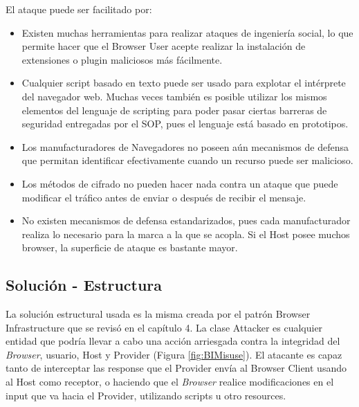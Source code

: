 \documentclass{sig-alternate-05-2015}
\begin{document}
El ataque puede ser facilitado por:
\begin{itemize}
  \item Existen muchas herramientas para realizar ataques de ingeniería social, lo que permite hacer que el Browser User acepte realizar la instalación de extensiones o plugin maliciosos más fácilmente.
  \item Cualquier script basado en texto puede ser usado para explotar el intérprete del navegador web. Muchas veces también es posible utilizar los mismos elementos del lenguaje de scripting para poder pasar ciertas barreras de seguridad entregadas por el SOP, pues el lenguaje está basado en prototipos. 
  \item Los manufacturadores de Navegadores no poseen aún mecanismos de defensa que permitan identificar efectivamente cuando un recurso puede ser malicioso.
  \item Los métodos de cifrado no pueden hacer nada contra un ataque que puede modificar el tráfico antes de enviar o después de recibir el mensaje.
  \item No existen mecanismos de defensa estandarizados, pues cada manufacturador realiza lo necesario para la marca a la que se acopla. Si el Host posee muchos browser, la superficie de ataque es bastante mayor.
\end{itemize}
\subsection{Solución - Estructura}
La solución estructural usada es la misma creada por el patrón Browser Infrastructure que se revisó en el capítulo 4. La clase Attacker es cualquier entidad que podría llevar a cabo una acción arriesgada contra la integridad del \textit{Browser}, usuario, Host y Provider (Figura \ref{fig:BIMisuse}). El atacante es capaz tanto de interceptar las response que el Provider envía al Browser Client usando al Host como receptor, o haciendo que el \textit{Browser} realice modificaciones en el input que va hacia el Provider, utilizando scripts u otro resources.
\end{document}
